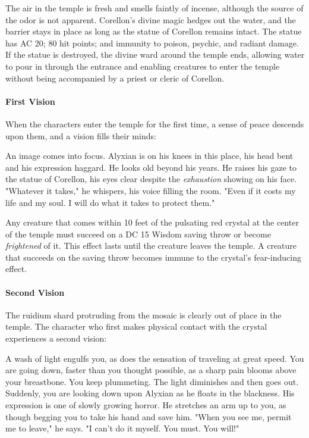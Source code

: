 \documentclass[a4paper, 11pt, bg=full, twocolumn, nooutline]{dndbook}
\begin{document}
The air in the temple is fresh and smells faintly of incense, although the source of the odor is not apparent. Corellon's divine magic hedges out the water, and the barrier stays in place as long as the statue of Corellon remains intact. The statue has AC 20; 80 hit points; and immunity to poison, psychic, and radiant damage. If the statue is destroyed, the divine ward around the temple ends, allowing water to pour in through the entrance and enabling creatures to enter the temple without being accompanied by a priest or cleric of Corellon.

\paragraph{First Vision}

When the characters enter the temple for the first time, a sense of peace descends upon them, and a vision fills their minds:

\begin{DndReadAloud}
An image comes into focus. Alyxian is on his knees in this place, his head bent and his expression haggard. He looks old beyond his years. He raises his gaze to the statue of Corellon, his eyes clear despite the \textit{exhaustion} showing on his face.
"Whatever it takes," he whispers, his voice filling the room. "Even if it costs my life and my soul. I will do what it takes to protect them."
\end{DndReadAloud}

Any creature that comes within 10 feet of the pulsating red crystal at the center of the temple must succeed on a DC 15 Wisdom saving throw or become \textit{frightened} of it. This effect lasts until the creature leaves the temple. A creature that succeeds on the saving throw becomes immune to the crystal's fear-inducing effect.

\paragraph{Second Vision}

The ruidium shard protruding from the mosaic is clearly out of place in the temple. The character who first makes physical contact with the crystal experiences a second vision:

\begin{DndReadAloud}
A wash of light engulfs you, as does the sensation of traveling at great speed. You are going down, faster than you thought possible, as a sharp pain blooms above your breastbone. You keep plummeting. The light diminishes and then goes out.
Suddenly, you are looking down upon Alyxian as he floats in the blackness. His expression is one of slowly growing horror. He stretches an arm up to you, as though begging you to take his hand and save him.
"When you see me, permit me to leave," he says. "I can't do it myself. You must. You will!"
\end{DndReadAloud}
\end{document}
